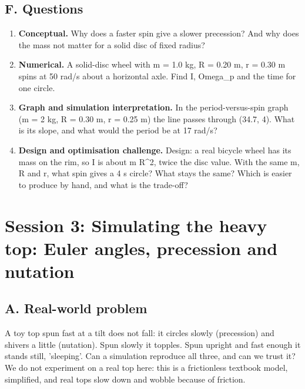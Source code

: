 \documentclass[11pt,a4paper]{article}
\begin{document}
\subsection*{F. Questions}
\begin{enumerate}[nosep]
\item \textbf{Conceptual.} Why does a faster spin give a slower precession? And why does the mass not matter for a solid disc of fixed radius?
\item \textbf{Numerical.} A solid-disc wheel with m = 1.0 kg, R = 0.20 m, r = 0.30 m spins at 50 rad/s about a horizontal axle. Find I, Omega\_p and the time for one circle.
\item \textbf{Graph and simulation interpretation.} In the period-versus-spin graph (m = 2 kg, R = 0.30 m, r = 0.25 m) the line passes through (34.7, 4). What is its slope, and what would the period be at 17 rad/s?
\item \textbf{Design and optimisation challenge.} Design: a real bicycle wheel has its mass on the rim, so I is about m R\textasciicircum{}2, twice the disc value. With the same m, R and r, what spin gives a 4 s circle? What stays the same? Which is easier to produce by hand, and what is the trade-off?
\end{enumerate}

\section{Session 3: Simulating the heavy top: Euler angles, precession and nutation}

\subsection*{A. Real-world problem}
A toy top spun fast at a tilt does not fall: it circles slowly (precession) and shivers a little (nutation). Spun slowly it topples. Spun upright and fast enough it stands still, 'sleeping'. Can a simulation reproduce all three, and can we trust it? We do not experiment on a real top here: this is a frictionless textbook model, simplified, and real tops slow down and wobble because of friction.
\end{document}
